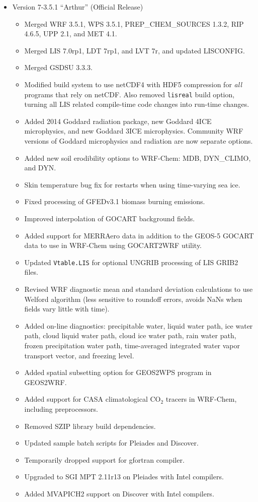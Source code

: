 \begin{itemize}
\item Version 7-3.5.1 ``Arthur'' (Official Release)
  \begin{itemize}
  \item Merged WRF 3.5.1, WPS 3.5.1, PREP\_CHEM\_SOURCES 1.3.2, RIP 4.6.5,
        UPP 2.1, and MET 4.1.
  \item Merged LIS 7.0rp1, LDT 7rp1, and LVT 7r, and updated LISCONFIG.
  \item Merged GSDSU 3.3.3.
  \item Modified build system to use netCDF4 with HDF5 compression for
        \emph{all} programs that rely on netCDF. Also removed \texttt{lisreal}
        build option, turning all LIS related compile-time code changes into
        run-time changes.
  \item Added 2014 Goddard radiation package, new Goddard 4ICE microphysics,
    and new Goddard 3ICE microphysics. Community WRF versions of Goddard
    microphysics and radiation are now separate options.
  \item Added new soil erodibility options to WRF-Chem: MDB, DYN\_CLIMO, and
    DYN.
  \item Skin temperature bug fix for restarts when using time-varying sea ice.
  \item Fixed processing of GFEDv3.1 biomass burning emissions.
  \item Improved interpolation of GOCART background fields.
  \item Added support for MERRAero data in addition to the GEOS-5 GOCART
    data to use in WRF-Chem using GOCART2WRF utility. 
  \item Updated \texttt{Vtable.LIS} for optional UNGRIB processing of LIS 
    GRIB2 files.
  \item Revised WRF diagnostic mean and standard deviation calculations to
   use Welford algorithm (less sensitive to roundoff errors, avoids NaNs when
   fields vary little with time).
  \item Added on-line diagnostics: precipitable water, liquid water path,
    ice water path, cloud liquid water path, cloud ice water path, rain water
    path, frozen precipitation water path, time-averaged integrated
    water vapor transport vector, and freezing level.
  \item Added spatial subsetting option for GEOS2WPS program in GEOS2WRF.
  \item Added support for CASA climatological CO$_2$ tracers in WRF-Chem,
    including preprocessors.
  \item Removed SZIP library build dependencies.
  \item Updated sample batch scripts for Pleiades and Discover.
  \item Temporarily dropped support for gfortran compiler.
  \item Upgraded to SGI MPT 2.11r13 on Pleiades with Intel compilers.
  \item Added MVAPICH2 support on Discover with Intel compilers.


\end{itemize}
\end{itemize}
